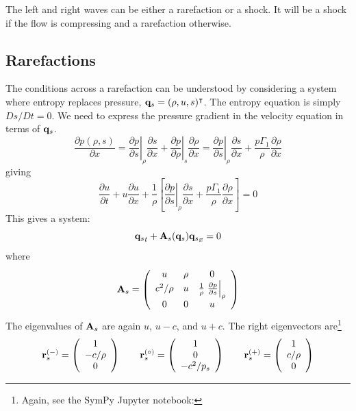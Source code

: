 The left and right waves can be either a rarefaction or a shock.  It will
be a shock if the flow is compressing and a rarefaction otherwise.


\subsection{Rarefactions}

The conditions across a rarefaction can be understood by considering
a system where entropy replaces pressure, ${\bf q}_s = (\rho, u, s)^\intercal$.
The entropy equation is simply $Ds/Dt = 0$.  We need to express the
pressure gradient in the velocity equation in terms of ${\bf q}_s$.
\begin{equation}
\frac{\partial p(\rho, s)}{\partial x} =
  \left . \frac{\partial p}{\partial s} \right |_\rho \frac{\partial s}{\partial x} +
  \left . \frac{\partial p}{\partial \rho} \right |_s \frac{\partial \rho}{\partial x}
=
  \left . \frac{\partial p}{\partial s} \right |_\rho \frac{\partial s}{\partial x} +
  \frac{p\Gamma_1}{\rho} \frac{\partial \rho}{\partial x}
\end{equation}
giving
\begin{equation}
\frac{\partial u}{\partial t} + u \frac{\partial u}{\partial x} + \frac{1}{\rho} \left [
     \left . \frac{\partial p}{\partial s} \right |_\rho \frac{\partial s}{\partial x} +
          \frac{p\Gamma_1}{\rho} \frac{\partial \rho}{\partial x} \right ] = 0
\end{equation}
This gives a system:
\begin{equation}
{{\bf q}_s}_t + {\bf A}_s({\bf q}_s) {{\bf q}_s}_x = 0
\end{equation}
where
\begin{equation}
{\bf A}_s =
 \left ( \begin{array}{ccc} u & \rho & 0 \\
        c^2/\rho & u & \frac{1}{\rho} \left . \frac{\partial p}{\partial s}\right |_\rho \\
        0 & 0 & u \end{array} \right )
\end{equation}
The eigenvalues of ${\bf A}_s$ are again $u$, $u-c$, and $u+c$.  The right eigenvectors
are\footnote{Again, see the {\sf SymPy} {\sf Jupyter} notebook:
}
\begin{align}
\rb_s^\evm = \left ( \begin{array}{c} 1 \\ -c/\rho \\ 0 \end{array} \right )
%
\qquad
\rb_s^\evz = \left ( \begin{array}{c} 1 \\ 0 \\ -c^2/p_s  \end{array} \right )
%
\qquad
\rb_s^\evp = \left ( \begin{array}{c} 1 \\ c/\rho \\ 0 \end{array} \right )
\end{align}
